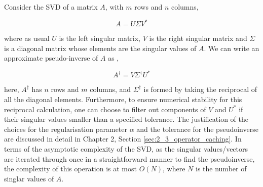 Consider the SVD of a matrix $A$, with $m$ rows and $n$ columns,

\begin{equation}
    A = U \Sigma V^*
\end{equation}

where as usual $U$ is the left singular matrix, $V$ is the right singular matrix
and $\Sigma$ is a diagonal matrix whose elements are the singular values of $A$.
We can write an approximate pseudo-inverse of $A$ as \cite{Trefethen:1997:SIAM},

\begin{equation}
    A^\dagger = V \Sigma^\dagger U^*
\end{equation}

here, $A^\dagger$ has $n$ rows and $m$ columns, and $\Sigma^\dagger$ is formed
by taking the reciprocal of all the diagonal elements. Furthermore, to ensure
numerical stability for this reciprocal calculation, one can choose to filter
out components of $V$ and $U^*$ if their singular values smaller than a specified
tolerance. The justification of the choices for the regularisation parameter
$\alpha$ and the tolerance for the pseudoinverse are discussed in detail in
Chapter 2, Section \ref{sec:2_3_operator_caching}. In terms of the asymptotic complexity of the \gls{SVD},
as the singular values/vectors are iterated through once in a straightforward
manner to find the pseudoinverse, the complexity of this operation is at most $O(N)$,
where $N$ is the number of singlar values of $A$.


